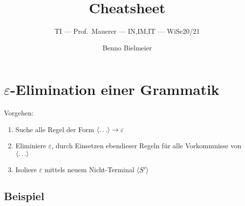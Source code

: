 \documentclass[a4paper,parskip=half,footsepline=on,headings=normal,titlepage=false]{scrartcl}
\title{Cheatsheet}
\subtitle{\acl{TI} --- Prof.~Mauerer --- IN,IM,IT --- \acs{WiSe}20/21}
\author{Benno Bielmeier}
\newcommand{\nt}[1]{\langle \uppercase{#1} \rangle}
\renewcommand{\epsilon}{\varepsilon}
\begin{document}

\begin{acronym}
\end{acronym}

\maketitle
\tableofcontents

\section{\texorpdfstring{$\epsilon$}{Epsilon}-Elimination einer Grammatik}
Vorgehen:
\begin{enumerate}[label=\alph*)]
    \item Suche alle Regel der Form {\color{c1}$\nt{\dots} \to \epsilon$}
    \item {\color{c2}Eliminiere $\epsilon$}, durch Einsetzen ebendieser Regeln für alle Vorkommnisse von \textcolor{c1}{$\nt{\dots}$}
    \item {\color{c3}Isoliere $\epsilon$} mittels neuem Nicht-Terminal \textcolor{c3}{$\nt{S'}$}
\end{enumerate}

\subsection*{Beispiel}
\end{document}
